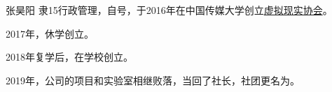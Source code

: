 \begin{section}{张昊阳}
	\label{person:张昊阳}
	隶15行政管理，自号，于2016年在中国传媒大学创立\hyperref[story:cucvr]{虚拟现实协会}。

	2017年，休学创立。

	2018年复学后，在学校创立。

	2019年，公司的项目和实验室相继败落，当回了社长，社团更名为。
\end{section}